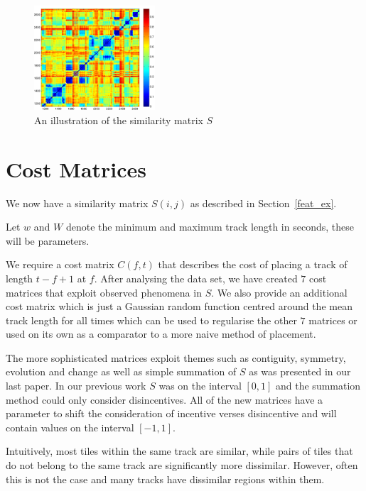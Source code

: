 \documentclass[twocolumn]{article}
\begin{document}
	\begin{figure}[t]
		\centering
		\includegraphics[width=0.4\textwidth]{images/simmat_plain}
		
		\caption{An illustration of the similarity matrix $S$}
		\label{fig:simmatrix}
	\end{figure} 
	
	\section{Cost Matrices}\label{costmatrix_sec} %
	
	We now have a similarity matrix $S(i,j)$ as described in Section~\ref{feat_ex}. 
	
	Let $w$ and $W$ denote the minimum and maximum track length in seconds, these will be parameters.
	
	We require a cost matrix $C(f,t)$ that describes the cost of placing a track of length $t-f+1$ at $f$. After analysing the data set, we have created $7$ cost matrices that exploit observed phenomena in $S$. We also provide an additional cost matrix which is just a Gaussian random function centred around the mean track length for all times which can be used to regularise the other $7$ matrices or used on its own as a comparator to a more naive method of placement. 
	
	The more sophisticated matrices exploit themes such as contiguity, symmetry, evolution and change as well as simple summation of $S$ as was presented in our last paper. In our previous work \cite{scarfe2013long} $S$ was on the interval $[0,1]$ and the summation method could only consider disincentives. All of the new matrices have a parameter to shift the consideration of incentive verses disincentive and will contain values on the interval $[-1,1]$.
	
	Intuitively, most tiles within the same track are similar, while pairs of tiles that do not belong to the same track are significantly more dissimilar. However, often this is not the case and many tracks have dissimilar regions within them. 
	
\end{document}
